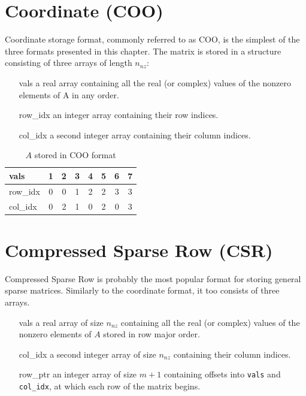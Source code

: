 \documentclass[thesis=M,english]{FITthesis}[2019/12/23]
\begin{document}
\section{Coordinate (COO)}\label{smsf:coo}

Coordinate storage format, commonly referred to as COO, is the simplest of the three formats presented in this
chapter. The matrix is stored in a  structure consisting of three arrays of length $n_{nz}$\cite{saad03:IMS}:

\begin{enumerate}
    \itemsep=0em
    \item[vals] a real array containing all the real (or complex) values of the nonzero elements of A in any order.
    \item[row\_idx] an integer array containing their row indices.
    \item[col\_idx] a second integer array containing their column indices.
\end{enumerate}

\begin{table}[h!]
    \centering
    \begin{tabular}{ |l||c|c|c|c|c|c|c| }
        \hline
        vals     & 1 & 2 & 3 & 4 & 5 & 6 & 7 \\
        \hline
        row\_idx & 0 & 0 & 1 & 2 & 2 & 3 & 3 \\
        \hline
        col\_idx & 0 & 2 & 1 & 0 & 2 & 0 & 3 \\
        \hline
    \end{tabular}
    \caption{$A$ stored in COO format}
\end{table}


\section{Compressed Sparse Row (CSR)}\label{smsf:csr}

Compressed Sparse Row is probably the most popular format for storing general sparse matrices.
\cite{saad03:IMS} Similarly to the coordinate format, it too consists of three arrays.

\begin{enumerate}
    \itemsep=0em
    \item[vals] a real array of size $n_{nz}$ containing all the real (or complex) values of the nonzero elements of $A$
        stored in row major order.
    \item[col\_idx] a second integer array of size $n_{nz}$ containing their column indices.
    \item[row\_ptr] an integer array of size $m + 1$ containing offsets into \lstinline{vals} and
        \lstinline!col_idx!, at which each row of the matrix begins.
\end{enumerate}
\end{document}
